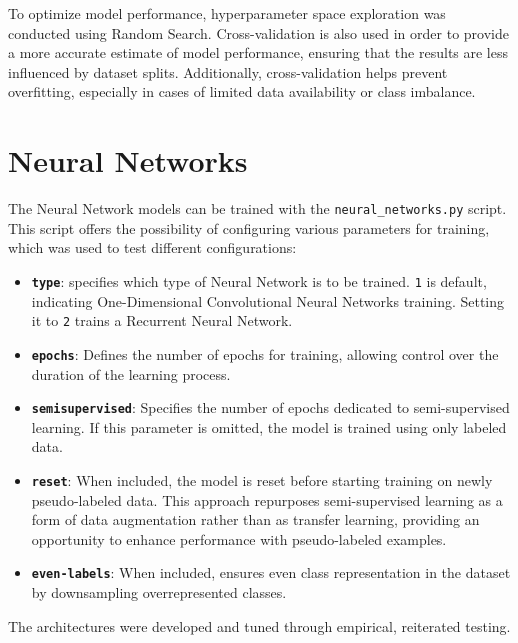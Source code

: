 To optimize model performance, hyperparameter space exploration was conducted
using Random Search.
Cross-validation is also used in order to provide a more accurate
estimate of model performance, ensuring that the results are less influenced
by dataset splits. Additionally, cross-validation helps prevent overfitting,
especially in cases of limited data availability or class imbalance. 



\section*{Neural Networks}
The Neural Network models can be trained with the \texttt{neural\_networks.py}
script. This script offers the possibility of configuring various parameters for
training, which was used to test different configurations:
\begin{itemize}
    \item \textbf{\texttt{type}}: specifies which type of Neural
    Network is to be trained. \texttt{1} is default, indicating
    One-Dimensional Convolutional Neural Networks training.
    Setting it to \texttt{2} trains a Recurrent Neural Network.

    \item \textbf{\texttt{epochs}}: Defines the number of epochs for training,
    allowing control over the duration of the learning process.

    \item \textbf{\texttt{semisupervised}}: Specifies the number of epochs
    dedicated to semi-supervised learning. If this parameter is omitted,
    the model is trained using only labeled data.

    \item \textbf{\texttt{reset}}: When included, the model is reset before
    starting training on newly pseudo-labeled data. This approach repurposes
    semi-supervised learning as a form of data augmentation rather than as
    transfer learning, providing an opportunity to enhance performance with
    pseudo-labeled examples.
    
    \item \textbf{\texttt{even-labels}}: When included, ensures even class
    representation in the dataset by downsampling overrepresented classes.
\end{itemize}

The architectures were developed and tuned through empirical,
reiterated testing.\\

